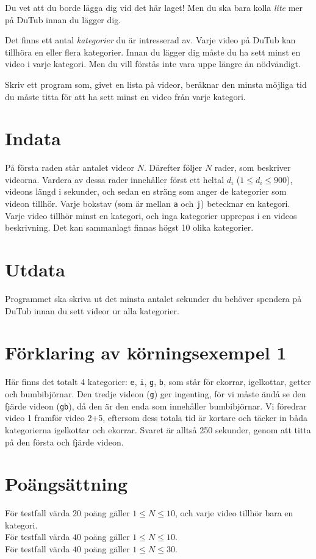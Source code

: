 
Du vet att du borde lägga dig vid det här laget! Men du ska bara kolla
{\em lite} mer på DuTub innan du lägger dig.

Det finns ett antal {\em kategorier} du är intresserad av. Varje
video på DuTub kan tillhöra en eller flera kategorier. Innan du lägger
dig måste du ha sett minst en video i varje kategori. Men du vill
förstås inte vara uppe längre än nödvändigt.

Skriv ett program som, givet en lista på videor, beräknar den minsta
möjliga tid du måste titta för att ha sett minst en video från varje kategori.

\section*{Indata}

På första raden står antalet videor $N$.
Därefter följer $N$ rader, som beskriver videorna.
Vardera av dessa rader innehåller först ett heltal $d_i$ ($1 \le d_i \le 900$), videons längd i sekunder,
och sedan en sträng som anger de kategorier som videon tillhör. Varje
bokstav (som är mellan \texttt a och \texttt j) betecknar en kategori. Varje
video tillhör minst en kategori, och inga kategorier upprepas i en videos
beskrivning. Det kan sammanlagt finnas högst 10 olika kategorier. 

\section*{Utdata}

Programmet ska skriva ut det minsta antalet sekunder du behöver spendera på DuTub innan du sett videor ur alla kategorier.

\section*{Förklaring av körningsexempel 1}

Här finns det totalt 4 kategorier: \texttt e, \texttt i, \texttt g, \texttt b, som står för ekorrar, igelkottar, getter och bumbibjörnar. Den tredje videon (\texttt{g}) ger ingenting, för vi måste ändå se den fjärde videon (\texttt{gb}), då den är den enda som innehåller bumbibjörnar. Vi föredrar video 1 framför video 2+5, eftersom dess totala tid är
kortare och täcker in båda kategorierna igelkottar och ekorrar. Svaret är alltså 250 sekunder, genom att titta på den första och fjärde videon.

\section*{Poängsättning}
För testfall värda $20$ poäng gäller $1 \le N \le 10$, och varje video tillhör bara en kategori.\\
För testfall värda $40$ poäng gäller $1 \le N \le 10$.\\
För testfall värda $40$ poäng gäller $1 \le N \le 30$.
